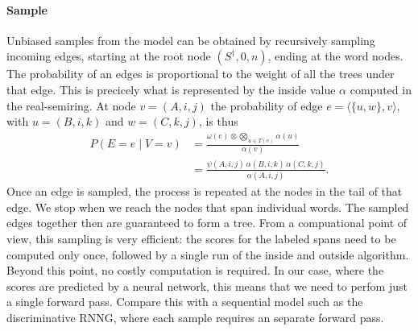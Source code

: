   \paragraph{Sample}
    Unbiased samples from the model can be obtained by recursively sampling incoming edges, starting at the root node $(S^{\dagger}, 0, n)$, ending at the word nodes. The probability of an edges is proportional to the weight of all the trees under that edge. This is precicely what is represented by the inside value $\alpha$ computed in the real-semiring. At node $v = (A, i, j)$ the probability of edge $e = \langle \{ u, w \}, v \rangle$, with $u = (B, i, k)$ and $w = (C, k, j)$, is thus
    \begin{align}
      \label{eq:sample}
      P(E = e \mid V = v)
        &= \frac{\omega(e) \otimes \bigotimes_{u \in T(e)} \alpha(u)}{\alpha(v)}  \nonumber  \\
        &= \frac{\psi(A, i, j) \, \alpha(B, i, k) \, \alpha(C, k, j)}{\alpha(A, i, j)}.
    \end{align}
    Once an edge is sampled, the process is repeated at the nodes in the tail of that edge. We stop when we reach the nodes that span individual words. The sampled edges together then are guaranteed to form a tree. From a compuational point of view, this sampling is very efficient: the scores for the labeled spans need to be computed only once, followed by a single run of the inside and outside algorithm. Beyond this point, no costly computation is required. In our case, where the scores are predicted by a neural network, this means that we need to perfom just a single forward pass. Compare this with a sequential model such as the discriminative RNNG, where each sample requires an separate forward pass.

